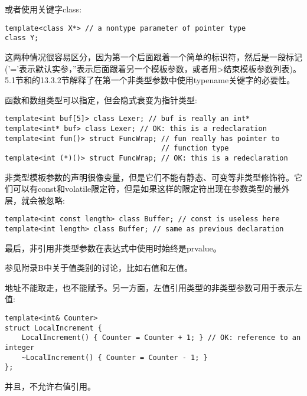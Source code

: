 或者使用关键字class:

\begin{lstlisting}[style=styleCXX]
template<class X*> // a nontype parameter of pointer type
class Y;
\end{lstlisting}

这两种情况很容易区分，因为第一个后面跟着一个简单的标识符，然后是一段标记('='表示默认实参，''表示后面跟着另一个模板参数，或者用>结束模板参数列表)。5.1节和的13.3.2节解释了在第一个非类型参数中使用typename关键字的必要性。

函数和数组类型可以指定，但会隐式衰变为指针类型:

\begin{lstlisting}[style=styleCXX]
template<int buf[5]> class Lexer; // buf is really an int*
template<int* buf> class Lexer; // OK: this is a redeclaration
template<int fun()> struct FuncWrap; // fun really has pointer to
								     // function type
template<int (*)()> struct FuncWrap; // OK: this is a redeclaration
\end{lstlisting}

非类型模板参数的声明很像变量，但是它们不能有静态、可变等非类型修饰符。它们可以有const和volatile限定符，但是如果这样的限定符出现在参数类型的最外层，就会被忽略:

\begin{lstlisting}[style=styleCXX]
template<int const length> class Buffer; // const is useless here
template<int length> class Buffer; // same as previous declaration
\end{lstlisting}

最后，非引用非类型参数在表达式中使用时始终是prvalue。 

\begin{tcolorbox}[colback=webgreen!5!white,colframe=webgreen!75!black]
\hspace*{0.75cm}参见附录B中关于值类别的讨论，比如右值和左值。
\end{tcolorbox}

地址不能取走，也不能赋予。另一方面，左值引用类型的非类型参数可用于表示左值:

\begin{lstlisting}[style=styleCXX]
template<int& Counter>
struct LocalIncrement {
	LocalIncrement() { Counter = Counter + 1; } // OK: reference to an integer
	~LocalIncrement() { Counter = Counter - 1; }
};
\end{lstlisting}

并且，不允许右值引用。


